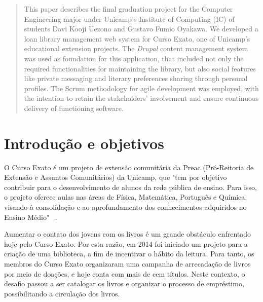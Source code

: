 \documentclass[a4paper]{article}
\begin{document}
\begin{abstract}
\normalsize
This paper describes the final graduation project for the Computer Engineering major under Unicamp's Institute of Computing (IC) of students Davi Kooji Uezono and Gustavo Fumio Oyakawa. We developed a loan library management web system for Curso Exato, one of Unicamp's educational extension projects. The \textit{Drupal} content management system was used as foundation for this application, that included not only the required functionalities for maintaining the library, but also social features like private messaging and literary preferences sharing through personal profiles. The Scrum methodology for agile development was employed, with the intention to retain the stakeholders' involvement and ensure continuous delivery of functioning software.
\end{abstract}

\pagebreak
\tableofcontents{}

\pagebreak
\clearpage
{}
\setcounter{page}{1}
\section{Introdução e objetivos}

O Curso Exato é um projeto de extensão comunitária da Preac (Pró-Reitoria de Extensão e Assuntos Comunitários) da Unicamp, que "tem por objetivo contribuir para o desenvolvimento de alunos da rede pública de ensino. Para isso, o projeto oferece aulas nas áreas de Física, Matemática, Português e Química, visando à consolidação e ao aprofundamento dos conhecimentos adquiridos no Ensino Médio" \ \cite{cursoexato}.

Aumentar o contato dos jovens com os livros é um grande obstáculo enfrentado hoje pelo Curso Exato. Por esta razão, em 2014 foi iniciado um projeto para a criação de uma biblioteca, a fim de incentivar o hábito da leitura. Para tanto, os membros do Curso Exato organizaram uma campanha de arrecadação de livros por meio de doações, e hoje conta com mais de cem títulos. Neste contexto, o desafio passou a ser catalogar os livros e organizar o processo de empréstimo, possibilitando a circulação dos livros.
\end{document}
